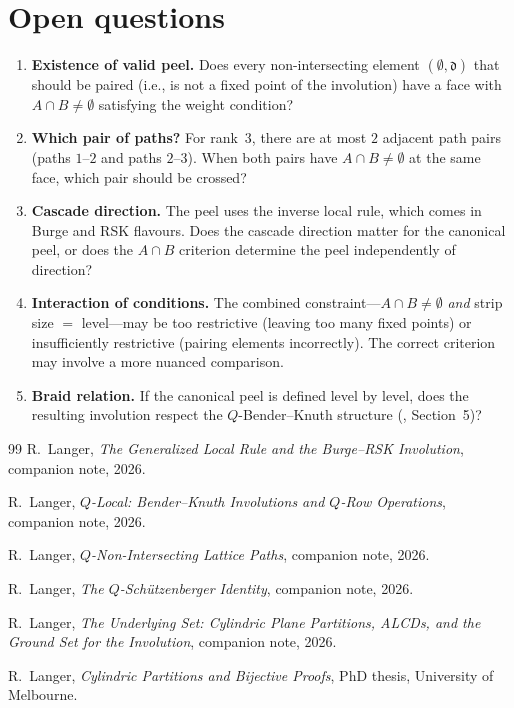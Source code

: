 \documentclass[11pt]{article}
\theoremstyle{plain}
\theoremstyle{definition}
\begin{document}
\section{Open questions}
\label{sec:open}

\begin{enumerate}
  \item \textbf{Existence of valid peel.}\;
    Does every non-intersecting element
    $(\emptyset, \mathfrak{d})$ that should be paired
    (i.e., is not a fixed point of the involution) have
    a face with $A \cap B \neq \emptyset$ satisfying the
    weight condition?

  \item \textbf{Which pair of paths?}\;
    For rank~$3$, there are at most $2$ adjacent path
    pairs (paths $1$--$2$ and paths $2$--$3$).  When both
    pairs have $A \cap B \neq \emptyset$ at the same face,
    which pair should be crossed?

  \item \textbf{Cascade direction.}\;
    The peel uses the inverse local rule, which comes in
    Burge and RSK flavours.  Does the cascade direction
    matter for the canonical peel, or does the $A \cap B$
    criterion determine the peel independently of
    direction?

  \item \textbf{Interaction of conditions.}\;
    The combined constraint---$A \cap B \neq \emptyset$
    \emph{and} strip size $= $ level---may be too
    restrictive (leaving too many fixed points) or
    insufficiently restrictive (pairing elements
    incorrectly).  The correct criterion may involve a
    more nuanced comparison.

  \item \textbf{Braid relation.}\;
    If the canonical peel is defined level by level,
    does the resulting involution respect the
    $Q$-Bender--Knuth structure
    (\cite{Q_LOCAL}, Section~5)?
\end{enumerate}


\begin{thebibliography}{99}
  R.~Langer,
  \emph{The Generalized Local Rule and the Burge--RSK
  Involution},
  companion note, 2026.

  R.~Langer,
  \emph{$Q$-Local: Bender--Knuth Involutions and
  $Q$-Row Operations},
  companion note, 2026.

  R.~Langer,
  \emph{$Q$-Non-Intersecting Lattice Paths},
  companion note, 2026.

  R.~Langer,
  \emph{The $Q$-Sch\"utzenberger Identity},
  companion note, 2026.

  R.~Langer,
  \emph{The Underlying Set: Cylindric Plane Partitions,
  ALCDs, and the Ground Set for the Involution},
  companion note, 2026.

  R.~Langer,
  \emph{Cylindric Partitions and Bijective Proofs},
  PhD thesis, University of Melbourne.
\end{thebibliography}
\end{document}
